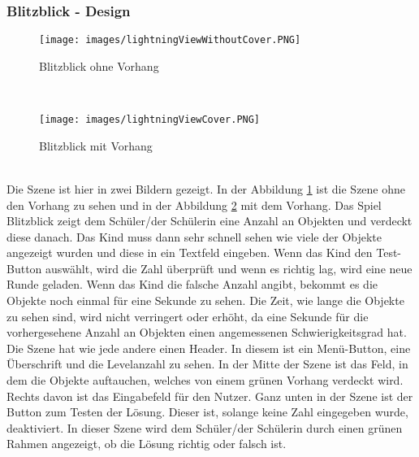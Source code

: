 \subsubsection{Blitzblick - Design}
\begin{figure}[htbp]
  \centering
  \texttt{[image: images/lightningViewWithoutCover.PNG]}
  \caption{Blitzblick ohne Vorhang}
  \label{withoutCover}
\end{figure}\\
\begin{figure}[htbp]
  \centering
  \texttt{[image: images/lightningViewCover.PNG]}
  \caption{Blitzblick mit Vorhang}
  \label{withCover}
\end{figure}\\
Die Szene ist hier in zwei Bildern gezeigt. In der Abbildung \ref{withoutCover} ist die Szene ohne den Vorhang zu sehen und in der Abbildung \ref{withCover} mit dem Vorhang. Das Spiel Blitzblick zeigt dem Schüler/der Schülerin eine Anzahl an Objekten und verdeckt diese danach. Das Kind muss dann sehr schnell sehen wie viele der Objekte angezeigt wurden und diese in ein Textfeld eingeben. Wenn das Kind den Test-Button auswählt, wird die Zahl überprüft und wenn es richtig lag, wird eine neue Runde geladen. Wenn das Kind die falsche Anzahl angibt, bekommt es die Objekte noch einmal für eine Sekunde zu sehen. Die Zeit, wie lange die Objekte zu sehen sind, wird nicht verringert oder erhöht, da eine Sekunde für die vorhergesehene Anzahl an Objekten einen angemessenen Schwierigkeitsgrad hat.\\
Die Szene hat wie jede andere einen Header. In diesem ist ein Menü-Button, eine Überschrift und die Levelanzahl zu sehen. In der Mitte der Szene ist das Feld, in dem die Objekte auftauchen, welches von einem grünen Vorhang verdeckt wird. Rechts davon ist das Eingabefeld für den Nutzer. Ganz unten in der Szene ist der Button zum Testen der Lösung. Dieser ist, solange keine Zahl eingegeben wurde, deaktiviert. In dieser Szene wird dem Schüler/der Schülerin durch einen grünen Rahmen angezeigt, ob die Lösung richtig oder falsch ist.\\
